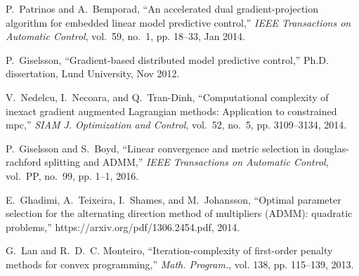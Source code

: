 \documentclass[doublecolumn]{IEEEtran}
\begin{document}
\begin{thebibliography}{10}
P.~Patrinos and A.~Bemporad, ``An accelerated dual gradient-projection
  algorithm for embedded linear model predictive control,'' \emph{IEEE
  Transactions on Automatic Control}, vol.~59, no.~1, pp. 18--33, Jan 2014.

P.~Giselsson, ``Gradient-based distributed model predictive control,'' Ph.D.
  dissertation, Lund University, Nov 2012.

V.~Nedelcu, I.~Necoara, and Q.~Tran-Dinh, ``Computational complexity of inexact
  gradient augmented {L}agrangian methods: Application to constrained mpc,''
  \emph{SIAM J. Optimization and Control}, vol.~52, no.~5, pp. 3109--3134,
  2014.

P.~Giselsson and S.~Boyd, ``Linear convergence and metric selection in
  douglas-rachford splitting and {ADMM},'' \emph{IEEE Transactions on Automatic
  Control}, vol.~PP, no.~99, pp. 1--1, 2016.

E.~Ghadimi, A.~Teixeira, I.~Shames, and M.~Johansson, ``Optimal parameter
  selection for the alternating direction method of multipliers ({ADMM}):
  quadratic problems,'' https://arxiv.org/pdf/1306.2454.pdf, 2014.

G.~Lan and R.~D.~C. Monteiro, ``Iteration-complexity of first-order penalty
  methods for convex programming,'' \emph{Math. Program.}, vol. 138, pp.
  115--139, 2013.

\end{thebibliography}
\end{document}
